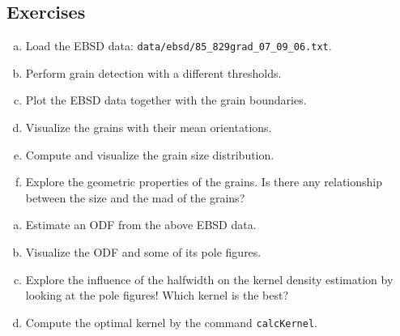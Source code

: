 \subsection*{Exercises}

\begin{frame}

  \begin{Exercise}
    \begin{enumerate}[a)]
      \item Load the EBSD data:
      \texttt{data/ebsd/85\_829grad\_07\_09\_06.txt}.
      \item Perform grain detection with a different thresholds.
      \item Plot the EBSD data together with the grain boundaries.
      \item Visualize the grains with their mean orientations.
      \item Compute and visualize the grain size distribution.
      \item Explore the geometric properties of the grains. Is there any
      relationship between the size and the mad of the grains?
    \end{enumerate}
  \end{Exercise}

  \begin{Exercise}
    \begin{enumerate}[a)]
      \item Estimate an ODF from the above EBSD data.
      \item Visualize the ODF and some of its pole figures.
      \item Explore the influence of the halfwidth on the kernel
      density estimation by looking at the pole figures! Which kernel is the best?
      \item Compute the optimal kernel by the command \texttt{calcKernel}.
    \end{enumerate}
  \end{Exercise}


\end{frame}


